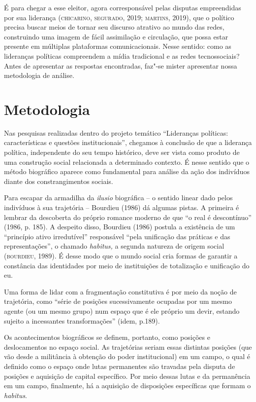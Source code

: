 É para chegar a esse eleitor, agora corresponsável pelas disputas
empreendidas por sua liderança (\textsc{chicarino}, \textsc{segurado}, 2019; \textsc{martins},
2019), que o político precisa buscar meios de tornar seu discurso
atrativo ao mundo das redes, construindo uma imagem de fácil assimilação
e circulação, que possa estar presente em múltiplas plataformas
comunicacionais. Nesse sentido: como as lideranças políticas compreendem
a mídia tradicional e as redes tecnossociais? Antes de apresentar as
respostas encontradas, faz"-se mister apresentar nossa metodologia de
análise.

\section{Metodologia}

\noindent{}Nas pesquisas realizadas dentro do projeto temático ``Lideranças
políticas: características e questões institucionais'', chegamos à
conclusão de que a liderança política, independente do seu tempo
histórico, deve ser vista como produto de uma construção social
relacionada a determinado contexto. É nesse sentido que o método
biográfico aparece como fundamental para análise da ação dos indivíduos
diante dos constrangimentos sociais.

Para escapar da armadilha da \emph{ilusio} biográfica -- o sentido
linear dado pelos indivíduos à sua trajetória -- Bourdieu (1986) dá
algumas pistas. A primeira é lembrar da descoberta do próprio romance
moderno de que ``o real é descontínuo'' (1986, p. 185). A despeito
disso, Bourdieu (1986) postula a existência de um ``princípio ativo
irredutível'' responsável ``pela unificação das práticas e das
representações'', o chamado \emph{habitus,} a segunda natureza de origem
social (\textsc{bourdieu}, 1989). É desse modo que o mundo social cria formas de
garantir a constância das identidades por meio de instituições de
totalização e unificação do eu.

Uma forma de lidar com a fragmentação constitutiva é por meio da noção
de trajetória, como ``série de posições sucessivamente ocupadas por um
mesmo agente (ou um mesmo grupo) num espaço que é ele próprio um devir,
estando sujeito a incessantes transformações'' (idem, p.189).

Os acontecimentos biográficos se definem, portanto, como posições e
deslocamentos no espaço social. As trajetórias seriam essas distintas
posições (que vão desde a militância à obtenção do poder institucional)
em um campo, o qual é definido como o espaço onde lutas permanentes são
travadas pela disputa de posições e aquisição de capital específico. Por
meio dessas lutas e da permanência em um campo, finalmente, há a
aquisição de disposições específicas que formam o \emph{habitus}.

